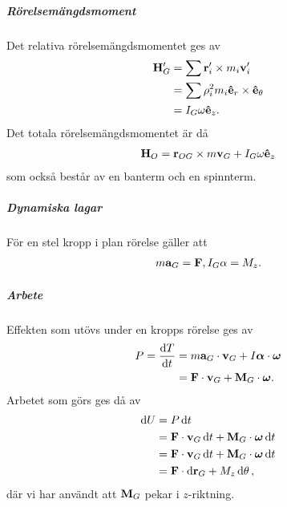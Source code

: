 \subparagraph{Rörelsemängdsmoment}
Det relativa rörelsemängdsmomentet ges av
\begin{align*}
	\vb{H}_{G}' &= \sum \vb{r}_{i}'\times m_{i}\vb{v}_{i}' \\
	            &= \sum \rho_{i}^{2} m_{i}\vu{e}_{r}\times\vu{e}_{\theta} \\
	            &= I_{G}\omega\vu{e}_{z}.
\end{align*}
Det totala rörelsemängdsmomentet är då
\begin{align*}
	\vb{H}_{O} = \vb{r}_{OG}\times m\vb{v}_{G} + I_{G}\omega\vu{e}_{z}
\end{align*}
som också består av en banterm och en spinnterm.

\subparagraph{Dynamiska lagar}
För en stel kropp i plan rörelse gäller att
\begin{align*}
	m\vb{a}_{G} = \vb{F}, I_{G}\alpha = M_{z}.
\end{align*}

\subparagraph{Arbete}
Effekten som utövs under en kropps rörelse ges av
\begin{align*}
	P = \dv{T}{t} &= m\vb{a}_{G}\cdot\vb{v}_{G} + I\vb*{\alpha}\cdot\vb*{\omega} \\
	              &= \vb{F}\cdot\vb{v}_{G} + \vb{M}_{G}\cdot\vb*{\omega}.
\end{align*}
Arbetet som görs ges då av
\begin{align*}
	\dd{U} &= P\dd{t} \\
	       &= \vb{F}\cdot\vb{v}_{G}\dd{t} + \vb{M}_{G}\cdot\vb*{\omega}\dd{t} \\
	       &= \vb{F}\cdot\vb{v}_{G}\dd{t} + \vb{M}_{G}\cdot\vb*{\omega}\dd{t} \\
	       &= \vb{F}\cdot\dd{\vb{r}_{G}} + M_{z}\dd{\theta},
\end{align*}
där vi har användt att $\vb{M}_{G}$ pekar i $z$-riktning.